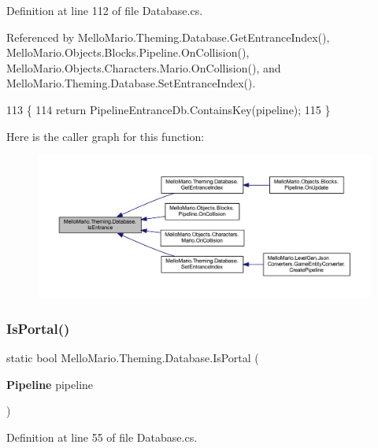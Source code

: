 Definition at line 112 of file Database.\+cs.



Referenced by Mello\+Mario.\+Theming.\+Database.\+Get\+Entrance\+Index(), Mello\+Mario.\+Objects.\+Blocks.\+Pipeline.\+On\+Collision(), Mello\+Mario.\+Objects.\+Characters.\+Mario.\+On\+Collision(), and Mello\+Mario.\+Theming.\+Database.\+Set\+Entrance\+Index().


\begin{DoxyCode}
113         \{
114             \textcolor{keywordflow}{return} PipelineEntranceDb.ContainsKey(pipeline);
115         \}
\end{DoxyCode}
Here is the caller graph for this function\+:
\nopagebreak
\begin{figure}[H]
\begin{center}
\leavevmode
\includegraphics[width=350pt]{classMelloMario_1_1Theming_1_1Database_a1c6942339fed6d28302debda9c4e6756_icgraph}
\end{center}
\end{figure}
\mbox{\label{classMelloMario_1_1Theming_1_1Database_abb6dce685c8a34a586fa4c8fc41fff87}} 
\subsubsection{Is\+Portal()}
{\footnotesize\ttfamily static bool Mello\+Mario.\+Theming.\+Database.\+Is\+Portal (\begin{DoxyParamCaption}\item[{\textbf{ Pipeline}}]{pipeline }\end{DoxyParamCaption})\hspace{0.3cm}{\ttfamily [static]}}



Definition at line 55 of file Database.\+cs.



